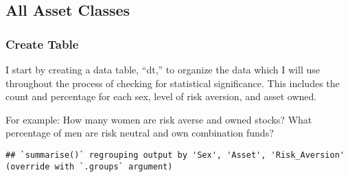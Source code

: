 \documentclass[
]{article}
\newenvironment{Shaded}{\begin{snugshade}}{\end{snugshade}}
\newcommand{\DataTypeTok}[1]{\textcolor[rgb]{0.13,0.29,0.53}{#1}}
\newcommand{\DecValTok}[1]{\textcolor[rgb]{0.00,0.00,0.81}{#1}}
\newcommand{\KeywordTok}[1]{\textcolor[rgb]{0.13,0.29,0.53}{\textbf{#1}}}
\newcommand{\NormalTok}[1]{#1}
\newcommand{\OperatorTok}[1]{\textcolor[rgb]{0.81,0.36,0.00}{\textbf{#1}}}
\newcommand{\StringTok}[1]{\textcolor[rgb]{0.31,0.60,0.02}{#1}}
\begin{document}
\hypertarget{all-asset-classes}{%
\subsection{All Asset Classes}\label{all-asset-classes}}

\hypertarget{create-table}{%
\subsubsection{Create Table}\label{create-table}}

I start by creating a data table, ``dt,'' to organize the data which I
will use throughout the process of checking for statistical
significance. This includes the count and percentage for each sex, level
of risk aversion, and asset owned.

For example: How many women are risk averse and owned stocks? What
percentage of men are risk neutral and own combination funds?

\begin{Shaded}
\end{Shaded}

\begin{verbatim}
## `summarise()` regrouping output by 'Sex', 'Asset', 'Risk_Aversion' (override with `.groups` argument)
\end{verbatim}
\end{document}

